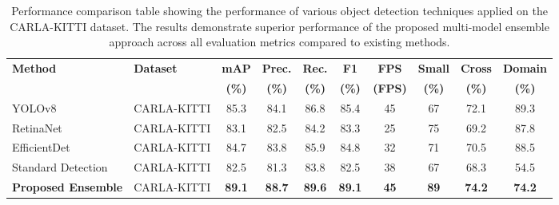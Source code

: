 \documentclass[conference]{IEEEtran}
\begin{document}
\begin{table*}[!htbp]
\centering
\caption{Performance comparison table showing the performance of various object detection techniques applied on the CARLA-KITTI dataset. The results demonstrate superior performance of the proposed multi-model ensemble approach across all evaluation metrics compared to existing methods.}
\label{tab:PerformanceMetrics} 
\footnotesize
\renewcommand{\arraystretch}{1.1}
\begin{tabular}{|l|l|c|c|c|c|c|c|c|c|}
\hline
\multirow{2}{*}{\textbf{Method}} & \multirow{2}{*}{\textbf{Dataset}} & \textbf{mAP} & \textbf{Prec.} & \textbf{Rec.} & \textbf{F1} & \textbf{FPS} & \textbf{Small} & \textbf{Cross} & \textbf{Domain} \\
& & \textbf{(\%)} & \textbf{(\%)} & \textbf{(\%)} & \textbf{(\%)} & \textbf{(FPS)} & \textbf{(\%)} & \textbf{(\%)} & \textbf{(\%)} \\ \hline
YOLOv8 & CARLA-KITTI & 85.3 & 84.1 & 86.8 & 85.4 & 45 & 67 & 72.1 & 89.3 \\ \hline
RetinaNet & CARLA-KITTI & 83.1 & 82.5 & 84.2 & 83.3 & 25 & 75 & 69.2 & 87.8 \\ \hline
EfficientDet & CARLA-KITTI & 84.7 & 83.8 & 85.9 & 84.8 & 32 & 71 & 70.5 & 88.5 \\ \hline
Standard Detection & CARLA-KITTI & 82.5 & 81.3 & 83.8 & 82.5 & 38 & 67 & 68.3 & 54.5 \\ \hline
\textbf{Proposed Ensemble} & CARLA-KITTI & \textbf{89.1} & \textbf{88.7} & \textbf{89.6} & \textbf{89.1} & \textbf{45} & \textbf{89} & \textbf{74.2} & \textbf{74.2} \\ \hline
\end{tabular}
\end{table*}

\end{document}
